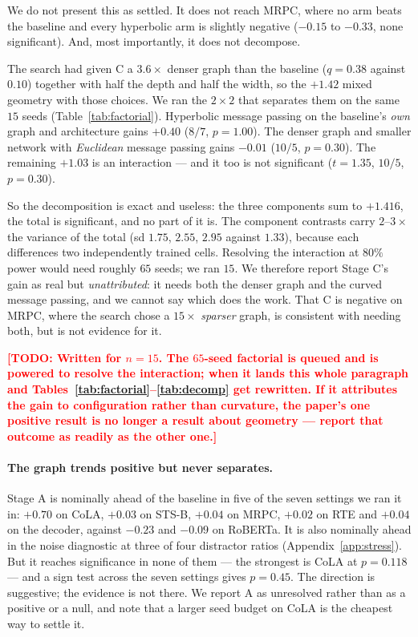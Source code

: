 \documentclass{article}
\newcommand{\TODO}[1]{\textcolor{red}{\textbf{[TODO: #1]}}}
\begin{document}
We do not present this as settled. It does not reach MRPC, where no arm beats
the baseline and every hyperbolic arm is slightly negative ($-0.15$ to $-0.33$,
none significant). And, most importantly, it does not decompose.

The search had given C a $3.6\times$ denser graph than the baseline ($q = 0.38$
against $0.10$) together with half the depth and half the width, so the $+1.42$
mixed geometry with those choices. We ran the $2\times2$ that separates them on
the same $15$ seeds (Table~\ref{tab:factorial}). Hyperbolic message passing on
the baseline's \emph{own} graph and architecture gains $+0.40$ ($8/7$,
$p=1.00$). The denser graph and smaller network with \emph{Euclidean} message
passing gains $-0.01$ ($10/5$, $p=0.30$). The remaining $+1.03$ is an
interaction --- and it too is not significant ($t=1.35$, $10/5$, $p=0.30$).

So the decomposition is exact and useless: the three components sum to $+1.416$,
the total is significant, and no part of it is. The component contrasts carry
$2$--$3\times$ the variance of the total (sd $1.75$, $2.55$, $2.95$ against
$1.33$), because each differences two independently trained cells. Resolving the
interaction at $80\%$ power would need roughly $65$ seeds; we ran $15$. We
therefore report Stage C's gain as real but \emph{unattributed}: it needs both
the denser graph and the curved message passing, and we cannot say which does
the work. That C is negative on MRPC, where the search chose a $15\times$
\emph{sparser} graph, is consistent with needing both, but is not evidence for
it.

\TODO{Written for $n=15$. The $65$-seed factorial is queued and is powered to
resolve the interaction; when it lands this whole paragraph and
Tables~\ref{tab:factorial}--\ref{tab:decomp} get rewritten. If it attributes
the gain to configuration rather than curvature, the paper's one positive
result is no longer a result about geometry --- report that outcome as
readily as the other one.}

\paragraph{The graph trends positive but never separates.} Stage A is nominally
ahead of the baseline in five of the seven settings we ran it in: $+0.70$ on
CoLA, $+0.03$ on STS-B, $+0.04$ on MRPC, $+0.02$ on RTE and $+0.04$ on the
decoder, against $-0.23$ and $-0.09$ on RoBERTa. It is also nominally ahead in
the noise diagnostic at three of four distractor ratios
(Appendix~\ref{app:stress}). But it reaches significance in none of them --- the
strongest is CoLA at $p = 0.118$ --- and a sign test across the seven settings
gives $p = 0.45$. The direction is suggestive; the evidence is not there. We
report A as unresolved rather than as a positive or a null, and note that a
larger seed budget on CoLA is the cheapest way to settle it.
\end{document}
